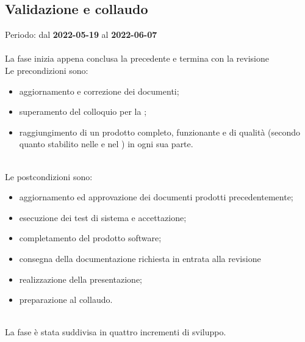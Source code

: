 \subsection{Validazione e collaudo}
Periodo: dal \textbf{2022-05-19} al \textbf{2022-06-07} \mbox{} \\ \mbox{} \\
La fase inizia appena conclusa la precedente e termina con la revisione \CA{} \\
Le precondizioni sono:
\begin{itemize}
 	\item aggiornamento e correzione dei documenti;
 	\item superamento del colloquio per la \PB{};
  	\item raggiungimento di un prodotto completo, funzionante e di qualità (secondo quanto stabilito nelle \NdP{} e nel \PdQ{} ) in ogni sua parte.
\end{itemize} \mbox{} \\
Le postcondizioni sono:
\begin{itemize}
	\item aggiornamento ed approvazione dei documenti prodotti precedentemente;
	\item esecuzione dei test di sistema e accettazione;
	\item completamento del prodotto software;
 	\item consegna della documentazione richiesta in entrata alla revisione \CA{}
	\item realizzazione della presentazione;
 	\item preparazione al collaudo.  
\end{itemize} \mbox{} \\
La fase è stata suddivisa in quattro incrementi di sviluppo.


